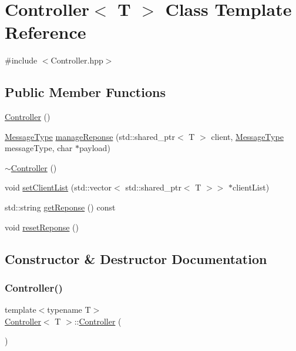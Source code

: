 \hypertarget{classController}{}\section{Controller$<$ T $>$ Class Template Reference}
\label{classController}


{\ttfamily \#include $<$Controller.\+hpp$>$}

\subsection*{Public Member Functions}
\begin{DoxyCompactItemize}
\item 
\hyperlink{classController_ab8c23e2388776e636cc225257a93278d}{Controller} ()
\item 
\hyperlink{NetworkInterface_8hpp_a36cbd2fb6499765a19ee1942d46c9f1f}{Message\+Type} \hyperlink{classController_a0c853a94aa63fdfee093dfab9d0e71c1}{manage\+Reponse} (std\+::shared\+\_\+ptr$<$ T $>$ client, \hyperlink{NetworkInterface_8hpp_a36cbd2fb6499765a19ee1942d46c9f1f}{Message\+Type} message\+Type, char $\ast$payload)
\item 
\hyperlink{classController_a72f857e60642c44e868c6438089054a5}{$\sim$\+Controller} ()
\item 
void \hyperlink{classController_ab0a4b7ba96fd7f9ba0865de7b85c8e9a}{set\+Client\+List} (std\+::vector$<$ std\+::shared\+\_\+ptr$<$ T $>$$>$ $\ast$client\+List)
\item 
std\+::string \hyperlink{classController_ab5985438cd9815c569dfd60a7ef77e40}{get\+Reponse} () const
\item 
void \hyperlink{classController_a315430280292371004d1213282e39a5f}{reset\+Reponse} ()
\end{DoxyCompactItemize}


\subsection{Constructor \& Destructor Documentation}
\mbox{\label{classController_ab8c23e2388776e636cc225257a93278d}} 
\subsubsection{\texorpdfstring{Controller()}{Controller()}}
{\footnotesize\ttfamily template$<$typename T$>$ \\
\hyperlink{classController}{Controller}$<$ T $>$\+::\hyperlink{classController}{Controller} (\begin{DoxyParamCaption}{ }\end{DoxyParamCaption})\hspace{0.3cm}{\ttfamily [inline]}}

